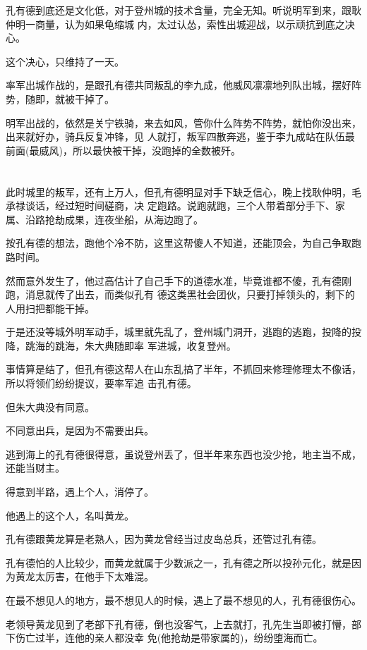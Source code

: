 \documentclass[11pt,a4paper,onecolumn]{article}
\begin{document}
孔有德到底还是文化低，对于登州城的技术含量，完全无知。听说明军到来，跟耿仲明一商量，认为如果龟缩城
内，太过认怂，索性出城迎战，以示顽抗到底之决心。

这个决心，只维持了一天。

率军出城作战的，是跟孔有德共同叛乱的李九成，他威风凛凛地列队出城，摆好阵势，随即，就被干掉了。

明军出战的，依然是关宁铁骑，来去如风，管你什么阵势不阵势，就怕你没出来，出来就好办，骑兵反复冲锋，见
人就打，叛军四散奔逃，鉴于李九成站在队伍最前面(最威风)，所以最快被干掉，没跑掉的全数被歼。

\section[\thesection]{}

此时城里的叛军，还有上万人，但孔有德明显对手下缺乏信心，晚上找耿仲明，毛承禄谈话，经过短时间磋商，决
定跑路。说跑就跑，三个人带着部分手下、家属、沿路抢劫成果，连夜坐船，从海边跑了。

按孔有德的想法，跑他个冷不防，这里这帮傻人不知道，还能顶会，为自己争取跑路时间。

然而意外发生了，他过高估计了自己手下的道德水准，毕竟谁都不傻，孔有德刚跑，消息就传了出去，而类似孔有
德这类黑社会团伙，只要打掉领头的，剩下的人用扫把都能干掉。

于是还没等城外明军动手，城里就先乱了，登州城门洞开，逃跑的逃跑，投降的投降，跳海的跳海，朱大典随即率
军进城，收复登州。

事情算是结了，但孔有德这帮人在山东乱搞了半年，不抓回来修理修理太不像话，所以将领们纷纷提议，要率军追
击孔有德。

但朱大典没有同意。

不同意出兵，是因为不需要出兵。

逃到海上的孔有德很得意，虽说登州丢了，但半年来东西也没少抢，地主当不成，还能当财主。

得意到半路，遇上个人，消停了。

他遇上的这个人，名叫黄龙。

孔有德跟黄龙算是老熟人，因为黄龙曾经当过皮岛总兵，还管过孔有德。

孔有德怕的人比较少，而黄龙就属于少数派之一，孔有德之所以投孙元化，就是因为黄龙太厉害，在他手下太难混。

在最不想见人的地方，最不想见人的时候，遇上了最不想见的人，孔有德很伤心。

老领导黄龙见到了老部下孔有德，倒也没客气，上去就打，孔先生当即被打懵，部下伤亡过半，连他的亲人都没幸
免(他抢劫是带家属的)，纷纷堕海而亡。
\end{document}
